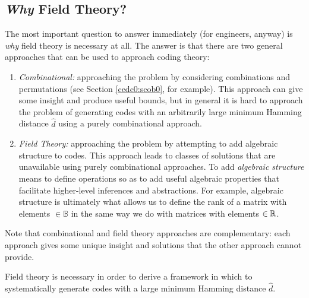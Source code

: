 \subsection{\emph{Why} Field Theory?}
\label{cedc0:sfft0:wft0}

The most important question to answer immediately (for engineers, anyway)
is \emph{why} field theory is necessary at all.  The answer is that
there are two general approaches that can be used to approach coding
theory:

\begin{enumerate}
\item \emph{Combinational:} 
      approaching the problem by considering combinations and
      permutations (see Section \ref{cedc0:scob0}, for example).  This approach
      can give some insight and produce useful bounds, but in general it is hard
      to approach the problem of generating codes with an arbitrarily large minimum
      Hamming distance $\hat{d}$ using a purely combinational approach.
\item \emph{Field Theory:} approaching the problem by attempting to add algebraic
      structure to codes.  This approach leads to classes of solutions that
      are unavailable using purely combinational approaches.  To add
      \emph{algebraic structure} means to define operations so as to add useful
      algebraic properties that facilitate higher-level inferences
      and abstractions.  For example,
      algebraic structure is ultimately what allows us to define the rank
      of a matrix with elements $\in \mathbb{B}$ in the same way we do with
      matrices with elements $\in {\mathbb{R}}$.
\end{enumerate}

Note that combinational and field theory approaches are complementary:  each
approach gives some unique insight and solutions that the other approach cannot
provide.

Field theory is necessary in order to derive a framework in which to 
systematically generate codes with a large minimum Hamming distance $\hat{d}$.


